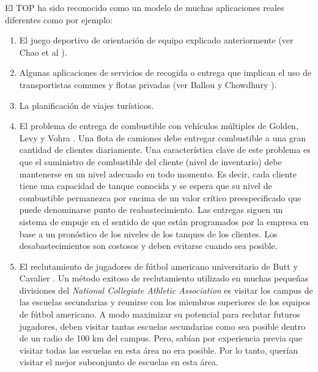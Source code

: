 El TOP ha sido reconocido como un modelo de muchas aplicaciones reales diferentes como por ejemplo:

\begin{enumerate}[i]

\item

El juego deportivo de orientación de equipo explicado anteriormente (ver Chao et al \cite{ChaoGoldenWasil}). 

\item

Algunas aplicaciones de servicios de recogida o entrega que implican el uso de transportistas comunes y flotas privadas (ver Ballou y Chowdhury \cite{BallouChowdhury}). 

\item

La planificación de viajes turísticos.

\item

El problema de entrega de combustible con vehículos múltiples de Golden, Levy y Vohra \cite{GoldenLevyVohra}. Una flota de camiones debe entregar combustible a una gran cantidad de clientes diariamente. Una característica clave de este problema es que el suministro de combustible del cliente (nivel de inventario) debe mantenerse en un nivel adecuado en todo momento. Es decir, cada cliente tiene una capacidad de tanque conocida y se espera que su nivel de combustible permanezca por encima de un valor crítico preespecificado que puede denominarse punto de reabastecimiento. Las entregas siguen un sistema de empuje en el sentido de que están programados por la empresa en base a un pronóstico de los niveles de los tanques de los clientes. Los desabastecimientos son costosos y deben evitarse cuando sea posible.

\item

El reclutamiento de jugadores de fútbol americano universitario de Butt y Cavalier \cite{ButtCavalier}. Un método exitoso de reclutamiento utilizado en muchas pequeñas divisiones del \textit{National Collegiate Athletic Association} es visitar los campus de las escuelas secundarias y reunirse con los miembros superiores de los equipos de fútbol americano. A modo maximizar su potencial para reclutar futuros jugadores, deben visitar tantas escuelas secundarias como sea posible dentro de un radio de 100 km del campus. Pero, sabían por experiencia previa que visitar todas las escuelas en esta área no era posible. Por lo tanto, querían visitar el mejor subconjunto de escuelas en esta área.


\end{enumerate}
